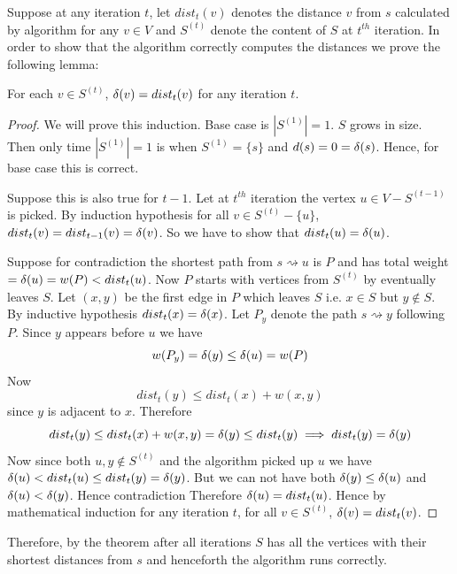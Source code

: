 Suppose at any iteration $t$, let $dist_t(v)$ denotes the distance $v$ from $s$ calculated by algorithm for any $v\in V$ and $S^{(t)}$ denote the content of $S$ at $t^{th}$ iteration. In order to show that the algorithm correctly computes the distances we prove the following lemma:
\begin{Theorem}{}{}
	For each $v\in S^{(t)}$, $\delta(v)=dist_t(v)$ for any iteration $t$.
\end{Theorem}
\begin{proof}
	We will prove this induction. Base case is $|S^{(1)}|=1$. $S$ grows in size. Then only time $|S^{(1)}|=1$ is when $S^{(1)}=\{s\}$ and $d(s)=0=\delta(s)$. Hence, for base case this is correct.

	Suppose this is also true for $t-1$. Let at $t^{th}$ iteration the vertex $u\in V-S^{(t-1)}$ is picked. By induction hypothesis for all $v\in S^{(t)}-\{u\}$, $dist_t(v)=dist_{t-1}(v)=\delta(v)$. So we have to show that $dist_{t}(u)=\delta(u)$.

	Suppose for contradiction the shortest path from $s\rightsquigarrow u$ is $P$ and has total weight $=\delta(u)=w(P)<dist_t(u)$. Now $P$ starts with vertices from $S^{(t)}$ by eventually leaves $S$. Let $(x,y)$ be the first edge in $P$ which leaves $S$ i.e. $x\in S$ but $y\notin S$. By inductive hypothesis $dist_t(x)=\delta(x)$. Let $P_y$ denote the path $s\rightsquigarrow y$ following $P$. Since $y$ appears before $u$ we have $$w(P_y)=\delta(y)\leq \delta(u)=w(P)$$Now $$dist_t(y)\leq dist_t(x)+w(x,y)$$ since $y$ is adjacent to $x$. Therefore $$dist_t(y)\leq dist_t(x)+w(x,y)=\delta(y)\leq dist_t(y)\implies dist_t(y)=\delta(y)$$Now since both $u,y\notin S^{(t)}$ and the algorithm picked up $u$ we have $\delta(u)<dist_t(u)\leq dist_t(y)=\delta(y)$. But we can not have both $\delta(y)\leq \delta(u)$ and $\delta(u)<\delta(y)$. Hence contradiction \ctr Therefore $\delta(u)=dist_t(u)$. Hence by mathematical induction for any iteration $t$, for all $v\in S^{(t)}$, $\delta(v)=dist_t(v)$.
\end{proof}

Therefore, by the theorem  after all iterations $S$ has all the vertices with their shortest distances from $s$ and henceforth the algorithm runs correctly.

